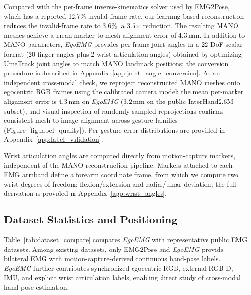 \documentclass{article}
\newcommand{\dataset}{\textit{EgoEMG}}
\begin{document}
Compared with the per-frame inverse-kinematics solver used by EMG2Pose, which
has a reported 12.7\% invalid-frame rate, our learning-based reconstruction
reduces the invalid-frame rate to 3.6\%, a 3.5$\times$ reduction. The resulting
MANO meshes achieve a mean marker-to-mesh alignment error of 4.3\,mm.
In addition to MANO parameters, \dataset{} provides per-frame joint angles in a
22-DoF scalar format (20 finger angles plus 2 wrist articulation angles) obtained
by optimizing UmeTrack joint angles to match MANO landmark positions;
the conversion procedure is described in
Appendix~\ref{app:joint_angle_conversion}.
As an independent cross-modal check, we reproject reconstructed MANO meshes
onto egocentric RGB frames using the calibrated camera model: the mean
per-marker alignment error is 4.3\,mm on \dataset{} (3.2\,mm on the
public InterHand2.6M subset), and visual inspection of randomly sampled
reprojections confirms consistent mesh-to-image alignment across gesture
families (Figure~\ref{fig:label_quality}). Per-gesture error distributions
are provided in Appendix~\ref{app:label_validation}.

Wrist articulation angles are computed directly from motion-capture markers,
independent of the MANO reconstruction pipeline. Markers attached to each EMG
armband define a forearm coordinate frame, from which we compute two wrist
degrees of freedom: flexion/extension and radial/ulnar deviation; the full
derivation is provided in Appendix~\ref{app:wrist_angles}.

\subsection{Dataset Statistics and Positioning}

Table~\ref{tab:dataset_compare} compares \dataset{} with representative public
EMG datasets. Among existing datasets, only EMG2Pose and \dataset{} provide
bilateral EMG with motion-capture-derived continuous hand-pose labels.
\dataset{} further contributes synchronized egocentric RGB, external RGB-D,
IMU, and explicit wrist articulation labels, enabling direct study of
cross-modal hand pose estimation.
\end{document}
